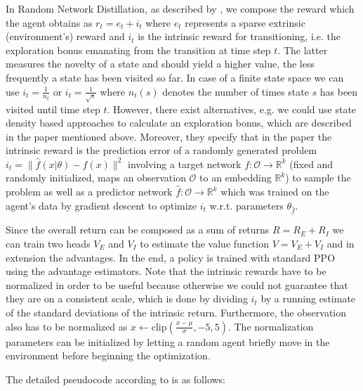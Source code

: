 In Random Network Distillation, as described by \cite{rnd-paper}, we compose the reward which the agent obtains as $r_{t} = e_{t} + i_{t}$ where $e_{t}$ represents a sparse extrinsic (environment's) reward and $i_{t}$ is the intrinsic reward for transitioning, i.e. the exploration bonus emanating from the transition at time step $t$. The latter measures the novelty of a state and should yield a higher value, the less frequently a state has been visited so far. In case of a finite state space we can use $i_{t} = \frac{1}{n_{t}}$ or $i_{t} = \frac{1}{\sqrt{s}}$ where $n_{t}(s)$ denotes the number of times state $s$ has been visited until time step $t$. However, there exist alternatives, e.g. we could use state density based approaches to calculate an exploration bonus, which are described in the paper mentioned above. Moreover, they specify that in the paper the intrinsic reward is the prediction error of a randomly generated problem $i_{t} = \|\hat{f}(x|\theta) - f(x)\|^{2}$ involving a target network $f: \mathcal{O} \rightarrow \mathbb{R}^{k}$ (fixed and randomly initialized, maps an observation $\mathcal{O}$ to an embedding $\mathbb{R}^{k}$) to sample the problem as well as a predictor network $\hat{f}: \mathcal{O} \rightarrow \mathbb{R}^{k}$ which was trained on the agent's data by gradient descent to optimize $i_{t}$ w.r.t. parameters $\theta_{\hat{f}}$.

\noindent Since the overall return can be composed as a sum of returns $R = R_{E} + R_{I}$ we can train two heads $V_{E}$ and $V_{I}$ to estimate the value function $V = V_{E} + V_{I}$ and in extension the advantages. In the end, a policy is trained with standard PPO using the advantage estimators. Note that the intrinsic rewards have to be normalized in order to be useful because otherwise we could not guarantee that they are on a consistent scale, which is done by dividing $i_{t}$ by a running estimate of the standard deviations of the intrinsic return. Furthermore, the observation also has to be normalized as $x \leftarrow \text{clip}(\frac{x - \mu}{\sigma}, -5, 5)$. The normalization parameters can be initialized by letting a random agent briefly move in the environment before beginning the optimization.

\noindent The detailed pseudocode according to \cite{rnd-paper} is as follows:

